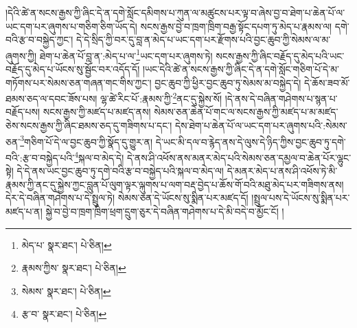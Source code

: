 །དེའི་ཚེ་ན་སངས་རྒྱས་ཀྱི་ཞིང་དེ་ན་དགེ་སློང་དམིགས་པ་ཀུན་ལ་མཚུངས་པར་ལྟ་བ་ཞེས་བྱ་བ་ཐེག་པ་ཆེན་པོ་ལ་ཡང་དག་པར་ཞུགས་པ་གཅིག་ཅིག་ཡོད་དེ། སངས་རྒྱས་བྱེ་བ་ཁྲག་ཁྲིག་བརྒྱ་སྟོང་དཔག་ཏུ་མེད་པ་རྣམས་ལ། དགེ་བའི་རྩ་བ་བསྐྱེད་ཀྱང་། དེ་དེ་སྲིད་ཀྱི་བར་དུ་བླ་ན་མེད་པ་ཡང་དག་པར་རྫོགས་པའི་བྱང་ཆུབ་ཀྱི་སེམས་ལ་མ་ཞུགས་ཀྱི། ཐེག་པ་ཆེན་པོ་བླ་ན་:མེད་པ་ལ་\footnote{མེད་པ་  སྣར་ཐང་།  པེ་ཅིན། }ཡང་དག་པར་ཞུགས་ཏེ། སངས་རྒྱས་ཀྱི་ཞིང་བརྗོད་དུ་མེད་པའི་ཡང་བརྗོད་དུ་མེད་པ་ཡོངས་སུ་སྦྱོང་བར་འདོད་དོ། །ཡང་དེའི་ཚེ་ན་སངས་རྒྱས་ཀྱི་ཞིང་དེ་ན་དགེ་སློང་གཅིག་པོ་དེ་མ་གཏོགས་པར་སེམས་ཅན་གཞན་གང་གིས་ཀྱང་། བྱང་ཆུབ་ཀྱི་ཕྱིར་བྱང་ཆུབ་ཏུ་སེམས་མ་བསྐྱེད་དེ། དེ་ཆོས་ཟབ་མོ་ཐམས་ཅད་ལ་དབང་ཟོས་པས། ལྷ་ཚེ་རིང་པོ་:རྣམས་ཀྱི་\footnote{རྣམས་ཀྱིས་  སྣར་ཐང་།  པེ་ཅིན། }ནང་དུ་སྐྱེས་སོ། །དེ་ནས་དེ་བཞིན་གཤེགས་པ་སྙན་པ་བརྗོད་པས། སངས་རྒྱས་ཀྱི་མཛད་པ་མཛད་ནས། སེམས་ཅན་ཆེན་པོ་གང་ལ་སངས་རྒྱས་ཀྱི་མཛད་པ་མ་མཛད་ཅེས་སངས་རྒྱས་ཀྱི་ཞིང་ཐམས་ཅད་དུ་གཟིགས་པ་དང་། དེས་ཐེག་པ་ཆེན་པོ་ལ་ཡང་དག་པར་ཞུགས་པའི་:སེམས་ཅན་\footnote{སེམས་  སྣར་ཐང་།  པེ་ཅིན། }གཅིག་པོ་དེ་ལ་བྱང་ཆུབ་ཀྱི་སྣོད་དུ་གྱུར་ན། དེ་ཡང་མི་དལ་བ་རྙེད་ནས་དེ་ལུས་དེ་ཉིད་ཀྱིས་བྱང་ཆུབ་ཏུ་དགེ་བའི་:རྩ་བ་བསྐྱེད་པའི་\footnote{རྩ་བ་  སྣར་ཐང་།  པེ་ཅིན། }སྐལ་བ་མེད་དེ། དེ་ནས་ཤི་འཕོས་ནས་མནར་མེད་པའི་སེམས་ཅན་དམྱལ་བ་ཆེན་པོར་ལྷུང་སྟེ། དེ་དེ་ནས་ཡང་བྱང་ཆུབ་ཏུ་དགེ་བའི་རྩ་བ་བསྐྱེད་པའི་སྐལ་བ་མེད་ལ། དེ་མནར་མེད་པ་ནས་ཤི་འཕོས་ཏེ་མི་རྣམས་ཀྱི་ནང་དུ་སྐྱེས་ཀྱང་བླུན་པོ་ལུག་ལྟར་ལྐུགས་པ་ལག་བརྡ་བྱེད་པ་ཆོས་གོ་བའི་མཐུ་མེད་པར་གཟིགས་ནས། དེར་དེ་བཞིན་གཤེགས་པ་དེ་སྤྲུལ་ཏེ། སེམས་ཅན་དེ་ཡོངས་སུ་སྨིན་པར་མཛད་དོ། །སྤྲུལ་པས་དེ་ཡོངས་སུ་སྨིན་པར་མཛད་པ་ན། སྐྱེ་བ་བྱེ་བ་ཁྲག་ཁྲིག་ཕྲག་དྲུག་ཅུར་དེ་བཞིན་གཤེགས་པ་དེ་མི་བདེ་བ་མྱོང་ངོ། །
